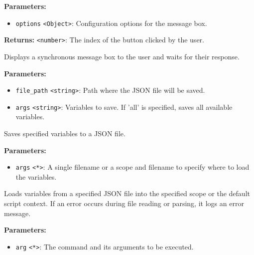 \documentclass[12pt,a4paper]{article}
\begin{document}
\noindent \textbf{Parameters:}
\begin{itemize}
  \item \texttt{options} \texttt{<Object>}: Configuration options for the message box.
\end{itemize}

\noindent \textbf{Returns:} \texttt{<number>}: The index of the button clicked by the user.

\noindent Displays a synchronous message box to the user and waits for their response.

\vspace{5mm}
\noindent {}


\noindent \textbf{Parameters:}
\begin{itemize}
  \item \texttt{file\_path} \texttt{<string>}: Path where the JSON file will be saved.
  \item \texttt{args} \texttt{<string>}: Variables to save. If 'all' is specified, saves all available variables.
\end{itemize}

\noindent Saves specified variables to a JSON file.

\vspace{5mm}
\noindent {}


\noindent \textbf{Parameters:}
\begin{itemize}
  \item \texttt{args} \texttt{<*>}: A single filename or a scope and filename to specify where to load the variables.
\end{itemize}

\noindent Loads variables from a specified JSON file into the specified scope or the default script context.
If an error occurs during file reading or parsing, it logs an error message.

\vspace{5mm}
\noindent {}


\noindent \textbf{Parameters:}
\begin{itemize}
  \item \texttt{arg} \texttt{<*>}: The command and its arguments to be executed.
\end{itemize}
\end{document}
